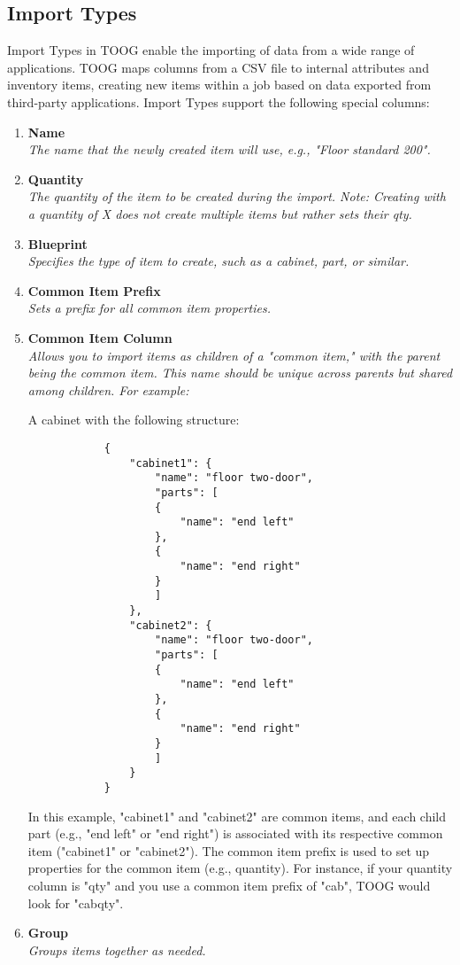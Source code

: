\documentclass{memoir}
\begin{document}
	\subsection{Import Types}
	
	Import Types in TOOG enable the importing of data from a wide range of applications. TOOG maps columns from a CSV file to internal attributes and inventory items, creating new items within a job based on data exported from third-party applications. Import Types support the following special columns:
	
	\begin{enumerate}[]
		\item \textbf{Name}\\
		\textit{The name that the newly created item will use, e.g., "Floor standard 200".}
		
		\item \textbf{Quantity}\\
		\textit{The quantity of the item to be created during the import. Note: Creating with a quantity of X does not create multiple items but rather sets their qty.}
		
		\item \textbf{Blueprint}\\
		\textit{Specifies the type of item to create, such as a cabinet, part, or similar.}
		
		\item \textbf{Common Item Prefix}\\
		\textit{Sets a prefix for all common item properties.}
		
		\item \textbf{Common Item Column}\\
		\textit{Allows you to import items as children of a "common item," with the parent being the common item. This name should be unique across parents but shared among children. For example:}
		
		A cabinet with the following structure:
		
		\begin{verbatim}
			{
				"cabinet1": {
					"name": "floor two-door",
					"parts": [
					{
						"name": "end left"
					},
					{
						"name": "end right"
					}
					]
				},
				"cabinet2": {
					"name": "floor two-door",
					"parts": [
					{
						"name": "end left"
					},
					{
						"name": "end right"
					}
					]
				}
			}
		\end{verbatim}
		
		In this example, "cabinet1" and "cabinet2" are common items, and each child part (e.g., "end left" or "end right") is associated with its respective common item ("cabinet1" or "cabinet2"). The common item prefix is used to set up properties for the common item (e.g., quantity). For instance, if your quantity column is "qty" and you use a common item prefix of "cab", TOOG would look for "cabqty".
		
		\item \textbf{Group}\\
		\textit{Groups items together as needed.}
	\end{enumerate}
\end{document}
